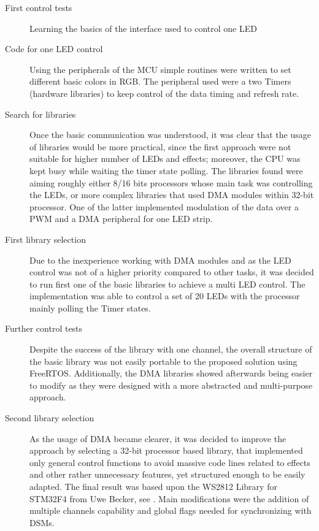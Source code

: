 \begin{description}
\item[First control tests] Learning the basics of the interface used to control one LED
\item[Code for one LED control] Using the peripherals of the MCU simple routines were written to set different basic colors in RGB. 
    The peripheral used were a two Timers (hardware libraries) to keep control of the data timing and refresh rate.
\item[Search for libraries] Once the basic communication was understood, it was clear that the usage of libraries would be more practical,
    since the first approach were not suitable for higher number of LEDs and effects; moreover, the CPU was kept busy while waiting 
    the timer state polling. The libraries found were aiming roughly either 8/16 bits processors whose main task was controlling the LEDs, 
    or more complex libraries that used DMA modules within 32-bit processor. One of the latter implemented modulation of the data over a PWM and a
    DMA peripheral for one LED strip.
\item[First library selection] Due to the inexperience working with DMA modules and as the LED control was not of a higher priority compared to other tasks, 
    it was decided to run first one of the basic libraries to achieve a multi LED control. The implementation was able to control a set of 20 LEDs
    with the processor mainly polling the Timer states.
\item[Further control tests] Despite the success of the library with one channel, the overall structure of the basic library
    was not easily portable to the proposed solution using FreeRTOS. Additionally, the DMA libraries showed afterwards being easier 
    to modify as they were designed with a more abstracted and multi-purpose approach.
\item[Second library selection] As the usage of DMA became clearer, it was decided to improve the approach by 
selecting a 32-bit processor based library, that implemented only general control functions to avoid massive code lines
related to effects and other rather unnecessary features, yet structured enough to be easily adapted. 
The final result was based upon the WS2812 Library for STM32F4 from Uwe Becker, see \cite{led_library}. 
    Main modifications were the addition of multiple channels capability and global flags needed for synchronizing with DSMs.
\end{description}


